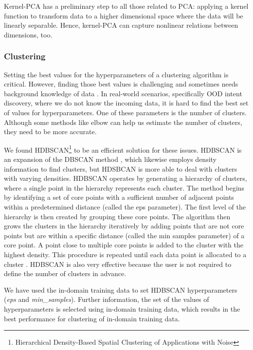 \documentclass{article}
\begin{document}
Kernel-PCA has a preliminary step to all those related to PCA: 
applying a kernel function to transform data to a higher dimensional space where the data will be linearly separable. 
Hence, kernel-PCA can capture nonlinear relations between dimensions, too.

\subsubsection{Clustering}

\noindent Setting the best values for the hyperparameters of a clustering algorithm is critical. 
However, finding those best values is challenging and sometimes needs background knowledge of data \citep{van2017constraint}.
In real-world scenarios, specifically OOD intent discovery, where we do not know the incoming data, 
it is hard to find the best set of values for hyperparameters. 
One of these parameters is the number of clusters. 
Although some methods like elbow can help us estimate the number of clusters, they need to be more accurate.

We found HDBSCAN\footnote{Hierarchical Density-Based Spatial Clustering of Applications with Noise} to be an efficient solution for these issues. 
HDBSCAN is an expansion of the DBSCAN method \citep{10.1007/978-3-642-37456-2_14}, 
which likewise employs density information to find clusters, 
but HDSBCAN is more able to deal with clusters with varying densities. 
HDBSCAN operates by generating a hierarchy of clusters, where a single point in the hierarchy represents each cluster. 
The method begins by identifying a set of core points with a sufficient number of adjacent points within a predetermined distance (called the eps parameter). 
The first level of the hierarchy is then created by grouping these core points. 
The algorithm then grows the clusters in the hierarchy iteratively by adding points that are not core points 
but are within a specific distance (called the min samples parameter) of a core point. 
A point close to multiple core points is added to the cluster with the highest density. 
This procedure is repeated until each data point is allocated to a cluster \citep{McInnes2017}. 
HDBSCAN is also very effective because the user is not required to define the number of clusters in advance. 

We have used the in-domain training data to set HDBSCAN hyperparameters (\emph{eps} and \emph{min\_samples}). 
Further information, the set of the values of hyperparameters is selected using in-domain training data, 
which results in the best performance for clustering of in-domain training data.
\end{document}
